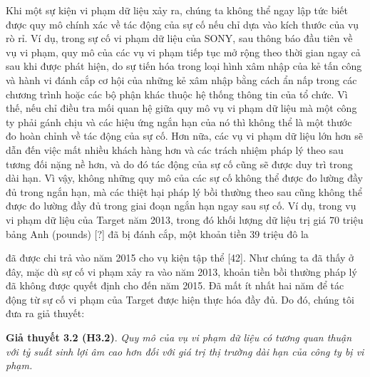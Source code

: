 Khi một sự kiện vi phạm dữ liệu xảy ra, chúng ta không thể ngay lập tức biết được quy mô chính xác về tác động của sự cố nếu chỉ dựa vào kích thước của vụ rò rỉ. Ví dụ, trong sự cố vi phạm dữ liệu của SONY, sau thông báo đầu tiên về vụ vi phạm, quy mô của các vụ vi phạm tiếp tục mở rộng theo thời gian ngay cả sau khi được phát hiện, do sự tiến hóa trong loại hình xâm nhập của kẻ tấn công và hành vi đánh cắp cơ hội của những kẻ xâm nhập bằng cách ẩn nấp trong các chương trình hoặc các bộ phận khác thuộc hệ thống thông tin của tổ chức. Vì thế, nếu chỉ điều tra mối quan hệ giữa quy mô vụ vi phạm dữ liệu mà một công ty phải gánh chịu và các hiệu ứng ngắn hạn của nó thì không thể là một thước đo hoàn chỉnh về tác động của sự cố. Hơn nữa, các vụ vi phạm dữ liệu lớn hơn sẽ dẫn đến việc mất nhiều khách hàng hơn và các trách nhiệm pháp lý theo sau tương đối nặng nề hơn, và do đó tác động của sự cố cũng sẽ được duy trì trong dài hạn. Vì vậy, không những quy mô của các sự cố không thể được đo lường đầy đủ trong ngắn hạn, mà các thiệt hại pháp lý bồi thường theo sau cũng không thể được đo lường đầy đủ trong giai đoạn ngắn hạn ngay sau sự cố. Ví dụ, trong vụ vi phạm dữ liệu của Target năm 2013, trong đó khối lượng dữ liệu trị giá 70 triệu bảng Anh (pounds) [?] đã bị đánh cắp, một khoản tiền 39 triệu đô la

đã được chi trả vào năm 2015 cho vụ kiện tập thể [42]. Như chúng ta đã thấy ở đây, mặc dù sự cố vi phạm xảy ra vào năm 2013, khoản tiền bồi thường pháp lý đã không được quyết định cho đến năm 2015. Đã mất ít nhất hai năm để tác động từ sự cố vi phạm của Target được hiện thực hóa đầy đủ. Do đó, chúng tôi đưa ra giả thuyết:

\textbf{Giả thuyết 3.2 (H3.2)}. \emph{Quy mô của vụ vi phạm dữ liệu có tương quan thuận với tỷ suất sinh lợi âm cao hơn đối với giá trị thị trường dài hạn của công ty bị vi phạm.}
